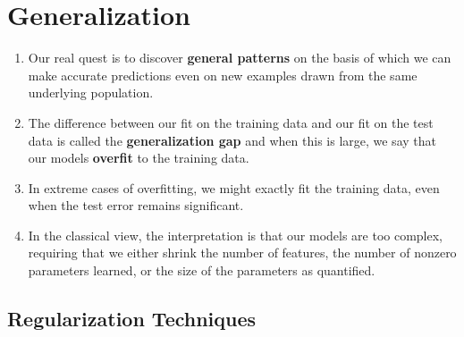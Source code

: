 \chapter{Generalization}


\begin{enumerate}
    \item Our real quest is to discover \textbf{general patterns} on the basis of which we can make accurate predictions even on new examples drawn from the same underlying population.

    \item The difference between our fit on the training data and our fit on the test data is called the \textbf{generalization gap} and when this is large, we say that our models \textbf{overfit} to the training data.

    \item In extreme cases of overfitting, we might exactly fit the training data, even when the test error remains significant. 
    
    \item In the classical view, the interpretation is that our models are too complex, requiring that we either shrink the number of features, the number of nonzero parameters learned, or the size of the parameters as quantified.
\end{enumerate}

\section{Regularization Techniques} \label{regularization techniques}

